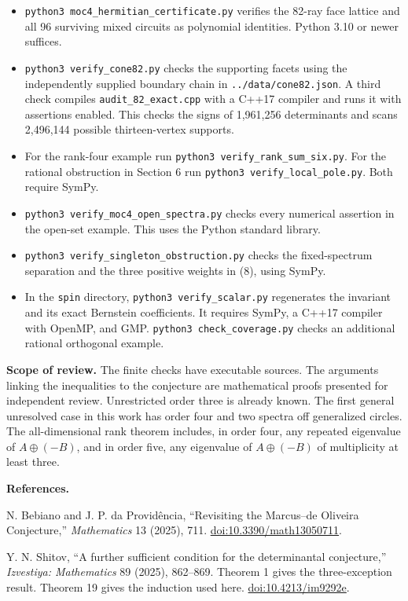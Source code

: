 \documentclass[11pt]{article}
\begin{document}
\begin{itemize}
\item \texttt{python3 moc4\_hermitian\_certificate.py} verifies the 82-ray face lattice and all 96 surviving mixed circuits as polynomial identities. Python 3.10 or newer suffices.
\item \texttt{python3 verify\_cone82.py} checks the supporting facets using the independently supplied boundary chain in \texttt{../data/cone82.json}. A third check compiles \texttt{audit\_82\_exact.cpp} with a C++17 compiler and runs it with assertions enabled. This checks the signs of 1,961,256 determinants and scans 2,496,144 possible thirteen-vertex supports.
\item For the rank-four example run \texttt{python3 verify\_rank\_sum\_six.py}. For the rational obstruction in Section 6 run \texttt{python3 verify\_local\_pole.py}. Both require SymPy.
\item \texttt{python3 verify\_moc4\_open\_spectra.py} checks every numerical assertion in the open-set example. This uses the Python standard library.
\item \texttt{python3 verify\_singleton\_obstruction.py} checks the fixed-spectrum separation and the three positive weights in (8), using SymPy.
\item In the \texttt{spin} directory, \texttt{python3 verify\_scalar.py} regenerates the invariant and its exact Bernstein coefficients. It requires SymPy, a C++17 compiler with OpenMP, and GMP. \texttt{python3 check\_coverage.py} checks an additional rational orthogonal example.
\end{itemize}
\par\textbf{Scope of review.} The finite checks have executable sources. The arguments linking the inequalities to the conjecture are mathematical proofs presented for independent review. Unrestricted order three is already known. The first general unresolved case in this work has order four and two spectra off generalized circles. The all-dimensional rank theorem includes, in order four, any repeated eigenvalue of $A\oplus(-B)$, and in order five, any eigenvalue of $A\oplus(-B)$ of multiplicity at least three.
\par\textbf{References.}
\par [1] N. Bebiano and J. P. da Provid\^encia, ``Revisiting the Marcus--de Oliveira Conjecture,'' \emph{Mathematics} 13 (2025), 711. \href{https://doi.org/10.3390/math13050711}{doi:10.3390/math13050711}.
\par [2] Y. N. Shitov, ``A further sufficient condition for the determinantal conjecture,'' \emph{Izvestiya: Mathematics} 89 (2025), 862--869. Theorem 1 gives the three-exception result. Theorem 19 gives the induction used here. \href{https://doi.org/10.4213/im9292e}{doi:10.4213/im9292e}.
\end{document}
